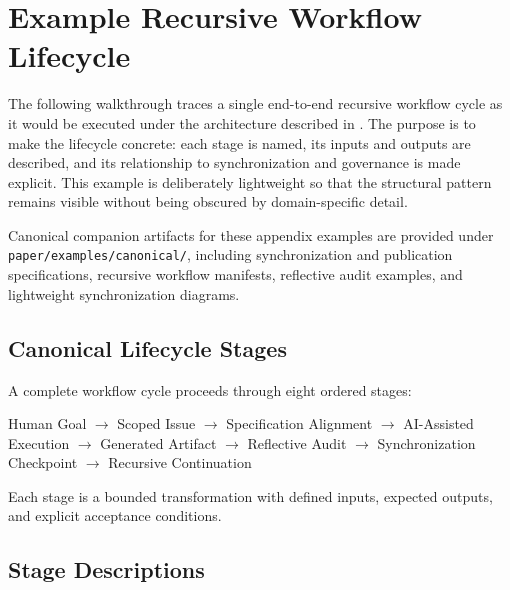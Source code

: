%
%

\section{Example Recursive Workflow Lifecycle}
\label{sec:appendix-workflow}

The following walkthrough traces a single end-to-end recursive workflow cycle as it would be executed under the  architecture described in . The purpose is to make the lifecycle concrete: each stage is named, its inputs and outputs are described, and its relationship to synchronization and governance is made explicit. This example is deliberately lightweight so that the structural pattern remains visible without being obscured by domain-specific detail.

Canonical companion artifacts for these appendix examples are provided under \texttt{paper/examples/canonical/}, including synchronization and publication specifications, recursive workflow manifests, reflective audit examples, and lightweight synchronization diagrams.

\subsection{Canonical Lifecycle Stages}

A complete  workflow cycle proceeds through eight ordered stages:

\begin{center}
Human Goal
$\rightarrow$ Scoped Issue
$\rightarrow$ Specification Alignment
$\rightarrow$ AI-Assisted Execution
$\rightarrow$ Generated Artifact
$\rightarrow$ Reflective Audit
$\rightarrow$ Synchronization Checkpoint
$\rightarrow$ Recursive Continuation
\end{center}

Each stage is a bounded transformation with defined inputs, expected outputs, and explicit acceptance conditions.

\subsection{Stage Descriptions}

